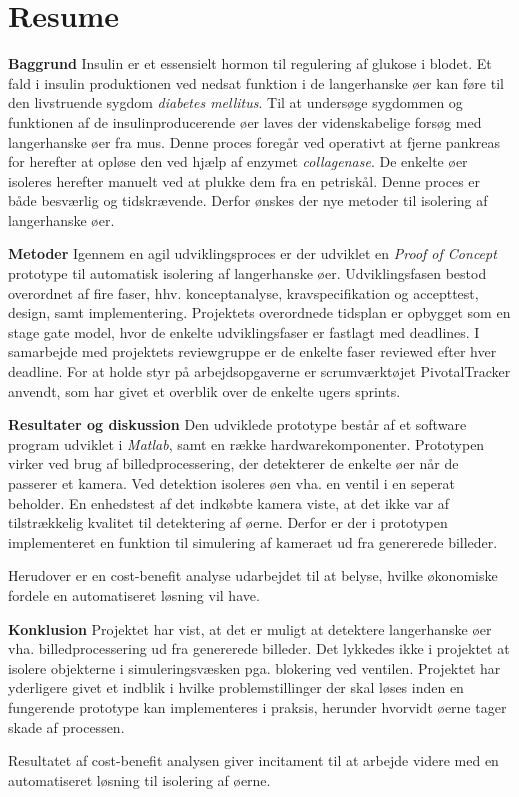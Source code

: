 \section*{Resume}
\textbf{Baggrund}
Insulin er et essensielt hormon til regulering af glukose i blodet. Et fald i insulin produktionen ved nedsat funktion i de langerhanske øer kan føre til den livstruende sygdom \textit{diabetes mellitus}. Til at undersøge sygdommen og funktionen af de insulinproducerende øer laves der videnskabelige forsøg med langerhanske øer fra mus. Denne proces foregår ved operativt at fjerne pankreas for herefter at opløse den ved hjælp af enzymet \textit{collagenase}. De enkelte øer isoleres herefter manuelt ved at plukke dem fra en petriskål. Denne proces er både besværlig og tidskrævende. Derfor ønskes der nye metoder til isolering af langerhanske øer.

\textbf{Metoder} Igennem en agil udviklingsproces er der udviklet en \textit{Proof of Concept} prototype til automatisk isolering af langerhanske øer. Udviklingsfasen bestod overordnet af fire faser, hhv. konceptanalyse, kravspecifikation og accepttest, design, samt implementering. Projektets overordnede tidsplan er opbygget som en stage gate model, hvor de enkelte udviklingsfaser er fastlagt med deadlines. I samarbejde med projektets reviewgruppe er de enkelte faser reviewed efter hver deadline. For at holde styr på arbejdsopgaverne er scrumværktøjet PivotalTracker anvendt, som har givet et overblik over de enkelte ugers sprints.

\textbf{Resultater og diskussion} Den udviklede prototype består af et software program udviklet i \textit{Matlab}, samt en række hardwarekomponenter. Prototypen virker ved brug af billedprocessering, der detekterer de enkelte øer når de passerer et kamera. Ved detektion isoleres øen vha. en ventil i en seperat beholder. En enhedstest af det indkøbte kamera viste, at det ikke var af tilstrækkelig kvalitet til detektering af øerne. Derfor er der i prototypen implementeret en funktion til simulering af kameraet ud fra genererede billeder.
 
Herudover er en cost-benefit analyse udarbejdet til at belyse, hvilke økonomiske fordele en automatiseret løsning vil have.   


\textbf{Konklusion} Projektet har vist, at det er muligt at detektere langerhanske øer vha. billedprocessering ud fra genererede billeder. Det lykkedes ikke i projektet at isolere objekterne i simuleringsvæsken pga. blokering ved ventilen. Projektet har yderligere givet et indblik i hvilke problemstillinger der skal løses inden en fungerende prototype kan implementeres i praksis, herunder hvorvidt øerne tager skade af processen. 

Resultatet af cost-benefit analysen giver incitament til at arbejde videre med en automatiseret løsning til isolering af øerne. 



